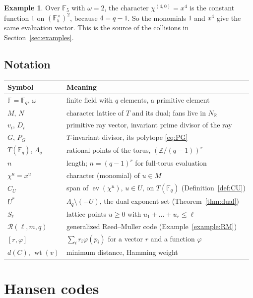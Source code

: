 \documentclass[12pt,letterpaper]{article}
\numberwithin{equation}{section}
\theoremstyle{definition}
\newtheorem{example}[theorem]{Example}
\theoremstyle{remark}
\DeclareMathOperator{\wt}{wt}
\DeclareMathOperator{\ev}{ev}
\newcommand{\F}{\mathbb{F}}
\newcommand{\Z}{\mathbb{Z}}
\newcommand{\R}{\mathbb{R}}
\newcommand{\Fq}{\mathbb{F}_q}
\newcommand{\RM}{\mathcal{R}}
\newcommand{\Lq}{\Lambda_q}
\begin{document}
\begin{example}
Over $\F_5$ with $\omega=2$, the character $\chi^{(4,0)}=x^4$ is the constant
function $1$ on $(\F_5^\times)^2$, because $4=q-1$. So the monomials $1$ and
$x^4$ give the same evaluation vector. This is the source of the collisions in
Section~\ref{sec:examples}.
\end{example}

\subsection{Notation}\label{sec:notation}

\begin{center}
\begin{tabular}{@{}p{}p{}@{}}
\toprule
Symbol & Meaning\\ \midrule
$\F=\Fq$, $\omega$ & finite field with $q$ elements, a primitive element\\
$M$, $N$ & character lattice of $T$ and its dual; fans live in $N_\R$\\
$v_i$, $D_i$ & primitive ray vector, invariant prime divisor of the ray\\
$G$, $P_G$ & $T$-invariant divisor, its polytope \eqref{eq:PG}\\
$T(\Fq)$, $\Lq$ & rational points of the torus, $(\Z/(q-1))^r$\\
$n$ & length; $n=(q-1)^r$ for full-torus evaluation\\
$\chi^u=x^u$ & character (monomial) of $u\in M$\\
$C_U$ & span of $\ev(\chi^u)$, $u\in U$, on $T(\Fq)$
(Definition~\ref{def:CU})\\
$U^*$ & $\Lq\setminus(-U)$, the dual exponent set (Theorem~\ref{thm:dual})\\
$S_\ell$ & lattice points $u\ge0$ with $u_1+\dots+u_r\le\ell$\\
$\RM(\ell,m,q)$ & generalized Reed--Muller code (Example~\ref{example:RM})\\
$[r,\varphi]$ & $\sum_i r_i\varphi(p_i)$ for a vector $r$ and a function
$\varphi$\\
$d(C)$, $\wt(v)$ & minimum distance, Hamming weight\\
\bottomrule
\end{tabular}
\end{center}

\section{Hansen codes}\label{sec:hansen}
\end{document}
